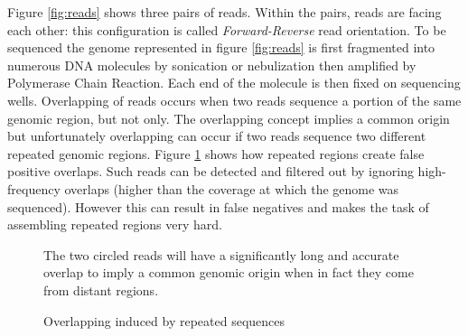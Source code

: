 \documentclass[12pt]{article}
\begin{document}
Figure \ref{fig:reads} shows three pairs of reads. Within the pairs, reads are facing each other: this configuration is called \textit{Forward-Reverse} read orientation. To be sequenced the genome represented in figure \ref{fig:reads} is first fragmented into numerous DNA molecules by sonication or nebulization then amplified by Polymerase Chain Reaction. Each end of the molecule is then fixed on sequencing wells. Overlapping of reads occurs when two reads sequence a portion of the same genomic region, but not only. The overlapping concept implies a common origin but unfortunately overlapping can occur if two reads sequence two different repeated genomic regions. Figure \ref{fig:overlapping} shows how repeated regions create false positive overlaps. Such reads can be detected and filtered out by ignoring high-frequency overlaps (higher than the coverage at which the genome was sequenced). However this can result in false negatives and makes the task of assembling repeated regions very hard.
\begin{figure}[h!]
\hspace*{4cm}
\caption{Overlapping induced by repeated sequences}
\label{fig:overlapping}
{\footnotesize  The two circled reads will have a significantly long and accurate overlap to imply a common genomic origin when in fact they come from distant regions.}
\end{figure}
\end{document}
